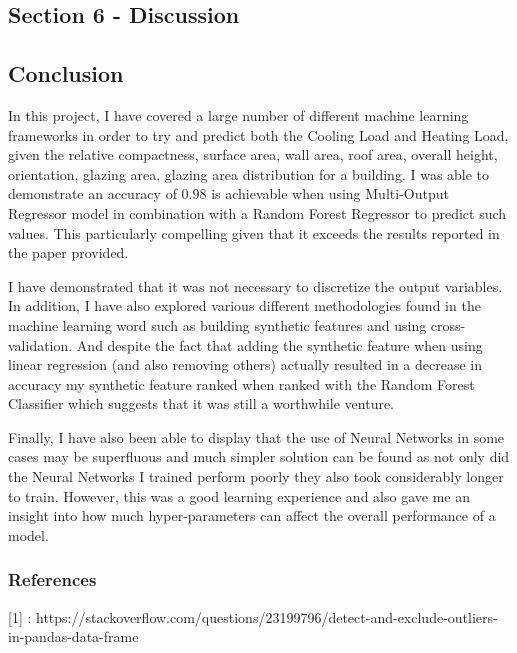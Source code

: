 \documentclass[11pt]{article}
\begin{document}
    \hypertarget{section-6---discussion}{%
\subsection{Section 6 - Discussion}\label{section-6---discussion}}

    \hypertarget{conclusion}{%
\subsection{Conclusion}\label{conclusion}}

In this project, I have covered a large number of different machine
learning frameworks in order to try and predict both the Cooling Load
and Heating Load, given the relative compactness, surface area, wall
area, roof area, overall height, orientation, glazing area, glazing area
distribution for a building. I was able to demonstrate an accuracy of
0.98 is achievable when using Multi-Output Regressor model in
combination with a Random Forest Regressor to predict such values. This
particularly compelling given that it exceeds the results reported in
the paper provided.

I have demonstrated that it was not necessary to discretize the output
variables. In addition, I have also explored various different
methodologies found in the machine learning word such as building
synthetic features and using cross-validation. And despite the fact that
adding the synthetic feature when using linear regression (and also
removing others) actually resulted in a decrease in accuracy my
synthetic feature ranked when ranked with the Random Forest Classifier
which suggests that it was still a worthwhile venture.

Finally, I have also been able to display that the use of Neural
Networks in some cases may be superfluous and much simpler solution can
be found as not only did the Neural Networks I trained perform poorly
they also took considerably longer to train. However, this was a good
learning experience and also gave me an insight into how much
hyper-parameters can affect the overall performance of a model.

    \hypertarget{references}{%
\subsubsection{References}\label{references}}

{[}1{]} :
https://stackoverflow.com/questions/23199796/detect-and-exclude-outliers-in-pandas-data-frame
\end{document}
